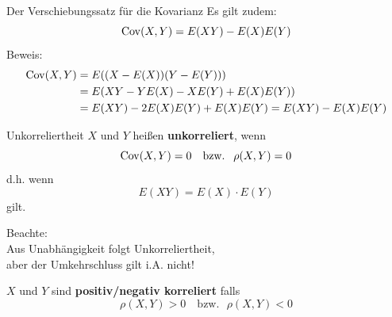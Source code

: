 \documentclass[
  10pt,
  ignorenonframetext,
]{beamer}
\begin{document}
\begin{frame}{Der Verschiebungssatz für die Kovarianz}
\protect\hypertarget{der-verschiebungssatz-fuxfcr-die-kovarianz}{}
Es gilt zudem: \[
\operatorname{Cov}(X,Y) = E(XY) - E(X)E(Y)
\] Beweis: \begin{align*}
\operatorname{Cov}(X,Y) &= E((X-E(X))(Y-E(Y))) \\
          &= E(XY - Y E(X) - X E(Y) + E(X)E(Y)) \\
          &= E(XY) - 2E(X)E(Y) +  E(X)E(Y) = E(XY) - E(X)E(Y)
\end{align*}
\end{frame}

\begin{frame}{Unkorreliertheit}
\protect\hypertarget{unkorreliertheit}{}
\(X\) und \(Y\) heißen \textbf{unkorreliert}, wenn \[
\operatorname{Cov}(X,Y) = 0 \quad \mbox{bzw.~ } \rho(X,Y) = 0
\] d.h. wenn \[
E(XY) = E (X) \cdot E (Y)
\] gilt.

Beachte:\\
Aus Unabhängigkeit folgt Unkorreliertheit,\\
aber der Umkehrschluss gilt i.A. nicht!

\(X\) und \(Y\) sind \textbf{positiv/negativ korreliert} falls \[
\rho(X,Y) > 0 \quad \mbox{bzw.~ } \rho(X,Y) < 0
\]

\end{frame}
\end{document}

